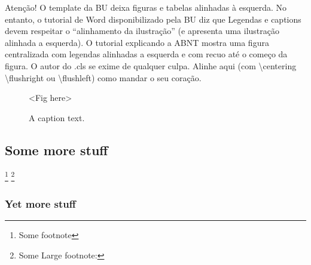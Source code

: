 \documentclass[english]{ufsc-thesis-rn46-2019}
\begin{document}
Atenção! O template da BU deixa figuras e tabelas alinhadas à esquerda. No entanto, o tutorial de Word disponibilizado pela BU diz que Legendas e captions devem respeitar o ``alinhamento da ilustração'' (e apresenta uma ilustração alinhada a esquerda). O tutorial explicando a ABNT mostra uma figura centralizada com legendas alinhadas a esquerda e com recuo até o começo da figura. O autor do .cls se exime de qualquer culpa. Alinhe aqui (com \textbackslash{}centering \textbackslash{}flushright ou \textbackslash{}flushleft) como mandar o seu coração.

\begin{figure}[tb]
  \centering
  \caption{\footnotesize A caption text.}
  \label{fig:f}

  <Fig here> 
\end{figure}


\subsection{Some more stuff}
\label{sec:more}

\lipsum[1] \footnote{Some footnote}
\footnote{Some Large footnote: \lipsum[4]}

\subsubsection{Yet more stuff}
\label{sec:yet-more}

\lipsum[1]

\label{sec:yet-another}

\lipsum[1]

\postextual

\end{document}
